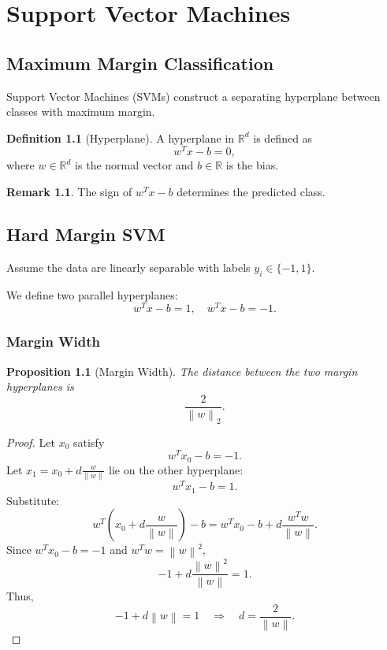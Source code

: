 \documentclass[12pt,oneside]{book}
\numberwithin{equation}{section}
\theoremstyle{definition}
\newtheorem{definition}{Definition}[section]
\newtheorem{remark}{Remark}[section]
\theoremstyle{plain}
\newtheorem{proposition}{Proposition}[section]
\theoremstyle{remark}
\newcommand{\R}{\mathbb{R}}
\newcommand{\norm}[1]{\left\lVert #1 \right\rVert}
\begin{document}
\chapter{Support Vector Machines}

\section{Maximum Margin Classification}

Support Vector Machines (SVMs) construct a separating hyperplane between classes with maximum margin.

\begin{definition}[Hyperplane]
A hyperplane in $\R^d$ is defined as
\[
w^T x - b = 0,
\]
where $w \in \R^d$ is the normal vector and $b \in \R$ is the bias.
\end{definition}

\begin{remark}
The sign of $w^T x - b$ determines the predicted class.
\end{remark}

\section{Hard Margin SVM}

Assume the data are linearly separable with labels $y_i \in \{-1,1\}$.

We define two parallel hyperplanes:
\[
w^T x - b = 1,
\quad
w^T x - b = -1.
\]

\subsection{Margin Width}

\begin{proposition}[Margin Width]
The distance between the two margin hyperplanes is
\[
\frac{2}{\norm{w}_2}.
\]
\end{proposition}

\begin{proof}
Let $x_0$ satisfy
\[
w^T x_0 - b = -1.
\]
Let $x_1 = x_0 + d\frac{w}{\norm{w}}$ lie on the other hyperplane:
\[
w^T x_1 - b = 1.
\]
Substitute:
\[
w^T\left(x_0 + d\frac{w}{\norm{w}}\right) - b
=
w^T x_0 - b + d \frac{w^T w}{\norm{w}}.
\]
Since $w^T x_0 - b = -1$ and $w^T w = \norm{w}^2$,
\[
-1 + d \frac{\norm{w}^2}{\norm{w}} = 1.
\]
Thus,
\[
-1 + d \norm{w} = 1
\quad \Rightarrow \quad
d = \frac{2}{\norm{w}}.
\]
\end{proof}
\end{document}

